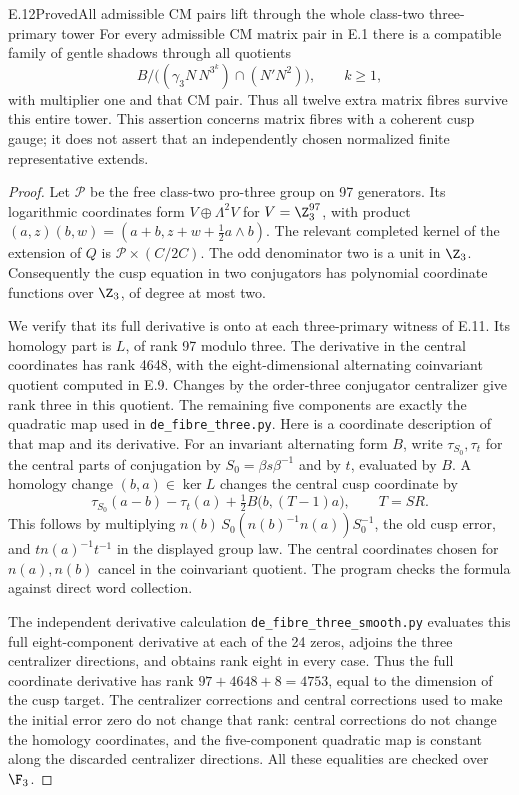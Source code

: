 \begin{statement}{E.12}{Proved}{All admissible CM pairs lift through the whole class-two three-primary tower}
For every admissible CM matrix pair in E.1 there is a compatible
family of gentle shadows through all quotients
\[
 B/\bigl((\gamma_3N\,N^{3^k})\cap(N'N^2)\bigr),\qquad k\geq1,
\]
with multiplier one and that CM pair. Thus all twelve extra matrix
fibres survive this entire tower. This assertion concerns matrix
fibres with a coherent cusp gauge; it does not assert that an
independently chosen normalized finite representative extends.
\end{statement}
\begin{proof}
Let $\mathcal P$ be the free class-two pro-three group on 97
generators. Its logarithmic coordinates form
$V\oplus\Lambda^2V$ for $V=\Z_3^{97}$, with product
$(a,z)(b,w)=(a+b,z+w+\frac12a\wedge b)$. The relevant completed
kernel of the extension of $Q$ is
$\mathcal P\times(C/2C)$. The odd denominator two is a unit in
$\Z_3$. Consequently the cusp equation in two conjugators has
polynomial coordinate functions over $\Z_3$, of degree at most two.

We verify that its full derivative is onto at each three-primary
witness of E.11. Its homology part is $L$, of rank 97 modulo three.
The derivative in the central coordinates has rank 4648, with the
eight-dimensional alternating coinvariant quotient computed in
E.9. Changes by the order-three conjugator centralizer give rank
three in this quotient. The remaining five components are exactly
the quadratic map used in \texttt{de\_fibre\_three.py}.
Here is a coordinate description of that map and its derivative.
For an invariant alternating form $B$, write $\tau_{S_0},\tau_t$
for the central parts of conjugation by $S_0=\beta s\beta^{-1}$
and by $t$, evaluated by $B$. A homology change $(b,a)\in\ker L$
changes the central cusp coordinate by
\[
 \tau_{S_0}(a-b)-\tau_t(a)
       +\tfrac12 B\bigl(b,(T-1)a\bigr),\qquad T=SR.
\]
This follows by multiplying
$n(b)\,S_0(n(b)^{-1}n(a))S_0^{-1}$, the old cusp error, and
$t n(a)^{-1}t^{-1}$ in the displayed group law. The central
coordinates chosen for $n(a),n(b)$ cancel in the coinvariant
quotient. The program checks the formula against direct word
collection.

The independent derivative calculation
\texttt{de\_fibre\_three\_smooth.py} evaluates this full
eight-component derivative at each of the 24 zeros, adjoins the
three centralizer directions, and obtains rank eight in every
case. Thus the full coordinate derivative has rank
$97+4648+8=4753$, equal to the dimension of the cusp target.
The centralizer corrections and central corrections used to make
the initial error zero do not change that rank: central corrections
do not change the homology coordinates, and the five-component
quadratic map is constant along the discarded centralizer
directions. All these equalities are checked over $\F_3$.


\end{proof}
